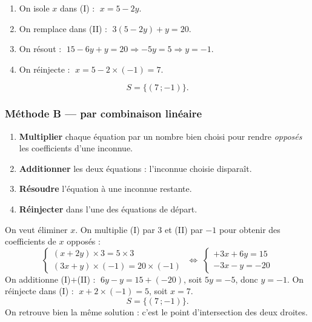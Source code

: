 \documentclass[11pt,a4paper]{article}
\begin{document}
\begin{exemple}
\begin{enumerate}[leftmargin=2em,topsep=2pt,itemsep=2pt]
  \item On isole $x$ dans (I) : $\;x=5-2y$.
  \item On remplace dans (II) : $\;3(5-2y)+y=20$.
  \item On résout : $\;15-6y+y=20 \Rightarrow -5y=5 \Rightarrow y=-1$.
  \item On réinjecte : $\;x=5-2\times(-1)=7$.
\end{enumerate}
\[ S=\{(7\,;-1)\}. \]
\end{exemple}

\subsubsection{Méthode B — par combinaison linéaire}

\begin{commentfaire}
\begin{enumerate}[leftmargin=2em,topsep=2pt,itemsep=2pt]
  \item \textbf{Multiplier} chaque équation par un nombre bien choisi pour rendre \emph{opposés} les coefficients d'une inconnue.
  \item \textbf{Additionner} les deux équations : l'inconnue choisie disparaît.
  \item \textbf{Résoudre} l'équation à une inconnue restante.
  \item \textbf{Réinjecter} dans l'une des équations de départ.
\end{enumerate}
\end{commentfaire}

\begin{exemple}
On veut éliminer $x$. On multiplie (I) par $3$ et (II) par $-1$ pour obtenir des coefficients de $x$ opposés :
\[ \begin{cases} (x+2y)\times 3=5\times 3 \\ (3x+y)\times(-1)=20\times(-1)\end{cases}
   \;\Longleftrightarrow\;
   \begin{cases} +3x+6y=15 \\ -3x-y=-20\end{cases} \]
On additionne (I)$+$(II) : $\;6y-y=15+(-20)$, soit $5y=-5$, donc $y=-1$.
On réinjecte dans (I) : $\;x+2\times(-1)=5$, soit $x=7$.
\[ S=\{(7\,;-1)\}. \]
On retrouve bien la même solution : c'est le point d'intersection des deux droites.
\end{exemple}
\end{document}
